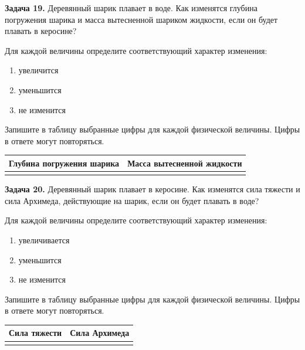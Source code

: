 \begin{taskbasic}[code={\label{task:fluid_ball_water_to_kerosene}}]
\textbf{Задача 19.} Деревянный шарик плавает в воде. Как изменятся глубина погружения шарика и масса вытесненной шариком жидкости, если он будет плавать в керосине?

Для каждой величины определите соответствующий характер изменения:
\begin{enumerate}
    \item увеличится
    \item уменьшится
    \item не изменится
\end{enumerate}

Запишите в таблицу выбранные цифры для каждой физической величины. Цифры в ответе могут повторяться.

\begin{center}
\begin{tabular}{|c|c|}
\hline
Глубина погружения шарика & Масса вытесненной жидкости \\ \hline
& \\ \hline
\end{tabular}
\end{center}

\end{taskbasic}

\begin{taskbasic}[code={\label{task:fluid_ball_kerosene_to_water}}]
\textbf{Задача 20.} Деревянный шарик плавает в керосине. Как изменятся сила тяжести и сила Архимеда, действующие на шарик, если он будет плавать в воде?

Для каждой величины определите соответствующий характер изменения:
\begin{enumerate}
    \item увеличивается
    \item уменьшится
    \item не изменится
\end{enumerate}

Запишите в таблицу выбранные цифры для каждой физической величины. Цифры в ответе могут повторяться.

\begin{center}
\begin{tabular}{|c|c|}
\hline
Сила тяжести & Сила Архимеда \\ \hline
& \\ \hline
\end{tabular}
\end{center}

\end{taskbasic}


